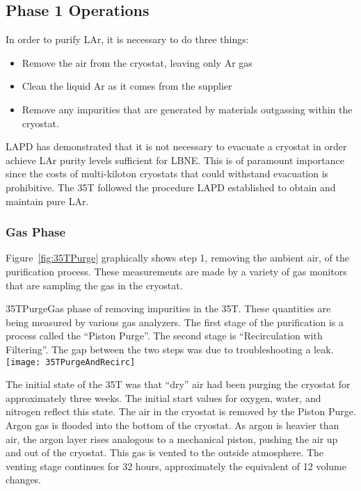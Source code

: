 \subsection {Phase 1 Operations}
In order to purify LAr, it is necessary to do three things: 
\begin{itemize}
\item{Remove the air from the cryostat, leaving only Ar gas}
\item{Clean the liquid Ar as it comes from the supplier}
\item{Remove any impurities that are generated by materials outgassing within the cryostat.}
\end{itemize}
  
LAPD has demonstrated that it is not necessary to evacuate a cryostat in order achieve 
LAr purity levels sufficient for LBNE. 
This is of paramount importance since the costs of multi-kiloton cryostats that 
could withstand evacuation is prohibitive. 
The 35T followed the procedure LAPD 
\cite{bib:lapdP07005}
established to obtain and maintain pure LAr. 

\subsubsection {Gas Phase}

Figure~\ref{fig:35TPurge} graphically shows step 1, removing the ambient air, of the purification process. These measurements are made by a variety of gas monitors that are sampling the gas in the cryostat. 

\begin{cdrfigure}{35TPurge}{Gas phase of removing impurities in the 35T. These quantities are being measured by various gas analyzers. The first stage of the purification is a process called the ``Piston Purge''.  The second stage is ``Recirculation with Filtering''. The gap between the two steps was due to troubleshooting a leak.}
  \texttt{[image: 35TPurgeAndRecirc]}
\end{cdrfigure}

The initial state of the 35T was that ``dry'' air had been purging the cryostat for approximately three weeks. The initial start values for oxygen, water, and nitrogen reflect this state.
The air in the cryostat is removed by  the Piston Purge.  Argon gas is flooded into the bottom of the cryostat. As argon is heavier than air, the argon layer rises analogous to a mechanical piston, pushing the air up and out of the cryostat. This gas is vented to the outside atmosphere. The venting stage continues for 32 hours, approximately the equivalent of 12 volume changes. 

